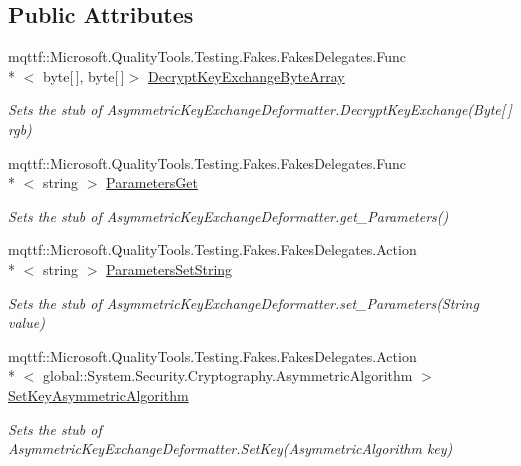 \subsection*{Public Attributes}
\begin{DoxyCompactItemize}
\item 
mqttf\-::\-Microsoft.\-Quality\-Tools.\-Testing.\-Fakes.\-Fakes\-Delegates.\-Func\\*
$<$ byte\mbox{[}$\,$\mbox{]}, byte\mbox{[}$\,$\mbox{]}$>$ \hyperlink{class_system_1_1_security_1_1_cryptography_1_1_fakes_1_1_stub_asymmetric_key_exchange_deformatter_adb2017934ea9b84b0945360becca709d}{Decrypt\-Key\-Exchange\-Byte\-Array}
\begin{DoxyCompactList}\small\item\em Sets the stub of Asymmetric\-Key\-Exchange\-Deformatter.\-Decrypt\-Key\-Exchange(\-Byte\mbox{[}$\,$\mbox{]} rgb)\end{DoxyCompactList}\item 
mqttf\-::\-Microsoft.\-Quality\-Tools.\-Testing.\-Fakes.\-Fakes\-Delegates.\-Func\\*
$<$ string $>$ \hyperlink{class_system_1_1_security_1_1_cryptography_1_1_fakes_1_1_stub_asymmetric_key_exchange_deformatter_a5a6ac184f4266db967e55b33f870329d}{Parameters\-Get}
\begin{DoxyCompactList}\small\item\em Sets the stub of Asymmetric\-Key\-Exchange\-Deformatter.\-get\-\_\-\-Parameters()\end{DoxyCompactList}\item 
mqttf\-::\-Microsoft.\-Quality\-Tools.\-Testing.\-Fakes.\-Fakes\-Delegates.\-Action\\*
$<$ string $>$ \hyperlink{class_system_1_1_security_1_1_cryptography_1_1_fakes_1_1_stub_asymmetric_key_exchange_deformatter_a17acbe2fef33ff1142e12d5718636686}{Parameters\-Set\-String}
\begin{DoxyCompactList}\small\item\em Sets the stub of Asymmetric\-Key\-Exchange\-Deformatter.\-set\-\_\-\-Parameters(\-String value)\end{DoxyCompactList}\item 
mqttf\-::\-Microsoft.\-Quality\-Tools.\-Testing.\-Fakes.\-Fakes\-Delegates.\-Action\\*
$<$ global\-::\-System.\-Security.\-Cryptography.\-Asymmetric\-Algorithm $>$ \hyperlink{class_system_1_1_security_1_1_cryptography_1_1_fakes_1_1_stub_asymmetric_key_exchange_deformatter_a86e331ed40cca45cd060c47d70d740d6}{Set\-Key\-Asymmetric\-Algorithm}
\begin{DoxyCompactList}\small\item\em Sets the stub of Asymmetric\-Key\-Exchange\-Deformatter.\-Set\-Key(\-Asymmetric\-Algorithm key)\end{DoxyCompactList}\end{DoxyCompactItemize}
